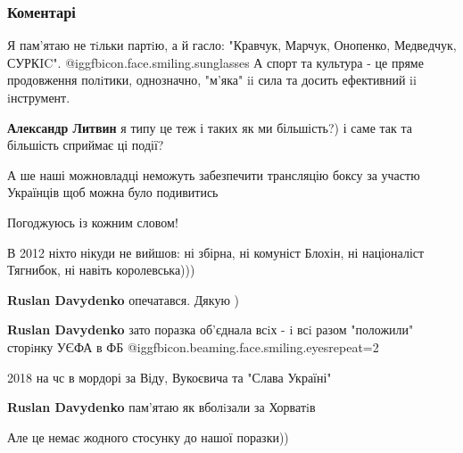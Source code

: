  
 
 
 
 
\subsubsection{Коментарі}
\label{sec:26_09_2021.fb.makitra_jaroslav.1.sport_politika_flag_usik.cmt}

\begin{itemize} %

Я пам'ятаю не тiльки партiю, а й гасло: "Кравчук, Марчук, Онопенко, Медведчук,
СУРКIC". @igg{fbicon.face.smiling.sunglasses}  А спорт та культура - це пряме продовження полiтики, однозначно,
"м'яка" ii сила та досить ефективний ii iнструмент.

\begin{itemize} %
\textbf{Александр Литвин} я типу це теж і таких як ми більшість?) і саме так та більшість сприймає ці події?
\end{itemize} %

А ше наші можновладці неможуть забезпечити трансляцію боксу за участю Українців щоб можна було подивитись


Погоджуюсь із кожним словом!

В 2012 ніхто нікуди не вийшов: ні збірна, ні комуніст Блохін, ні націоналіст Тягнибок, ні навіть королевська)))

\begin{itemize} %
\textbf{Ruslan Davydenko} опечатався. Дякую )

\textbf{Ruslan Davydenko} зато поразка об'єднала всiх - i всi разом "положили" сторiнку УЄФА в ФБ @igg{fbicon.beaming.face.smiling.eyes}{repeat=2} 

2018 на чс в мордорі за Віду, Вукоєвича та "Слава Україні"

\textbf{Ruslan Davydenko} пам'ятаю як вболiзали за Хорватiв

Але це немає жодного стосунку до нашої поразки))
\end{itemize} %


\end{itemize}
